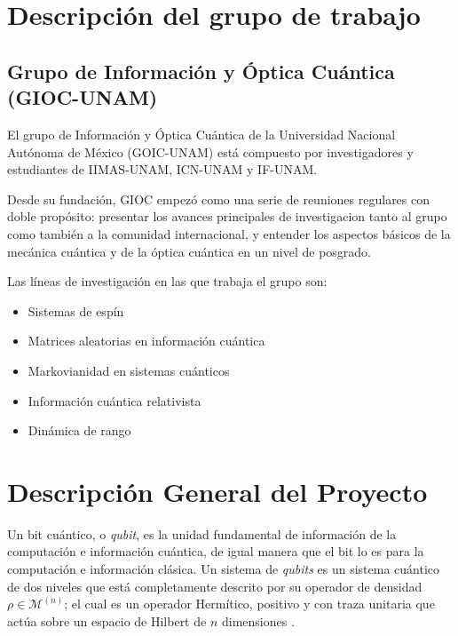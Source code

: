 \documentclass[11pt, spanish, letterpage]{article}
\begin{document}
\section{Descripción del grupo de trabajo}
\subsection{Grupo de Información y Óptica Cuántica (GIOC-UNAM)}
El grupo de Información y Óptica Cuántica de la Universidad Nacional Autónoma de México (GOIC-UNAM) está compuesto por investigadores y estudiantes de IIMAS-UNAM, ICN-UNAM y IF-UNAM. 

Desde su fundación, GIOC empezó como una serie de reuniones regulares con doble propósito: presentar los avances principales de investigacion tanto al grupo como también a la comunidad internacional, y entender los aspectos básicos de la mecánica cuántica y de la óptica cuántica en un nivel de posgrado. 

Las líneas de investigación en las que trabaja el grupo son:
\begin{itemize}
	\item Sistemas de espín
	\item Matrices aleatorias en información cuántica
	\item Markovianidad en sistemas cuánticos
	\item Información cuántica relativista
	\item Dinámica de rango
\end{itemize}
\pagebreak
\section{Descripción General del Proyecto}
Un bit cuántico, o \textit{qubit}, es la unidad fundamental de información de la computación e información cuántica, de igual manera que el bit lo es para la computación e información clásica. Un sistema de \textit{qubits} es un sistema cuántico de dos niveles que está completamente descrito por su operador de densidad $\rho \in \mathcal{M}^{(n)}$; el cual es un operador Hermítico, positivo y con traza unitaria que actúa sobre un espacio de Hilbert de $n$ dimensiones \cite{nielsen_chuang_2011}. 

\end{document}
